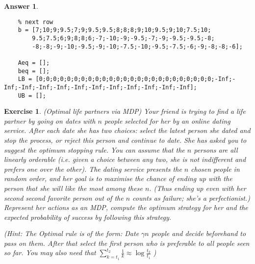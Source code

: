 \documentclass[12pt]{article}
\theoremstyle{colon}
\newtheorem{exercise}{Exercise}
\newtheorem*{answer}{Answer}
\begin{document}
\begin{answer}
\begin{lstlisting}[style=Matlab-editor, basicstyle=\scriptsize]
    % Use the grading table reading each row left to right before moving to the
    % next row
    b = [7;10;9;9.5;7;9;9.5;9.5;8;8;8;9;10;9.5;9;10;7.5;10;
        9.5;7.5;6;9;8;8;6;-7;-10;-9;-9.5;-7;-9;-9.5;-9.5;-8;
        -8;-8;-9;-10;-9.5;-9;-10;-7.5;-10;-9.5;-7.5;-6;-9;-8;-8;-6];

    Aeq = [];
    beq = [];
    LB = [0;0;0;0;0;0;0;0;0;0;0;0;0;0;0;0;0;0;0;0;0;0;0;0;0;-Inf;-Inf;-Inf;-Inf;-Inf;-Inf;-Inf;-Inf;-Inf;-Inf;-Inf;-Inf];
    UB = [];
  \end{lstlisting}
\end{answer}

\clearpage

\begin{exercise}
  (Optimal life partners via MDP) Your friend is trying to find a life partner by going on dates with $n$ people selected for her by an online dating service. After each date she has two choices: select the latest person she dated and stop the process, or reject this person and continue to date. She has asked you to suggest the optimum \textit{stopping rule}. You can assume that the $n$ persons are all linearly orderable (i.e. given a choice between any two, she is not indifferent and prefers one over the other). The dating service presents the $n$ chosen people in random order, and her goal is to maximise the chance of ending up with the person that she will like the most among these $n$. (Thus ending up even with her second second favorite person out of the $n$ counts as failure; she's a perfectionist.) Represent her actions as an MDP, compute the optimum strategy for her and the expected probability of success by following this strategy.

  (Hint: The Optimal rule is of the form: \textit{Date $\gamma n$ people and decide beforehand to pass on them. After that select the first person who is preferable to all people seen so far. You may also need that $\sum_{k=t_1}^{t_2} \frac{1}{k} \approx \log \frac{t_2}{t_1}$ })
\end{exercise}
\end{document}
